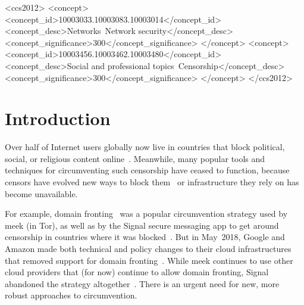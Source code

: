 \documentclass[sigconf]{acmart}
\begin{document}
\begin{CCSXML}
  <ccs2012>
  <concept>
  <concept_id>10003033.10003083.10003014</concept_id>
  <concept_desc>Networks~Network security</concept_desc>
  <concept_significance>300</concept_significance>
  </concept>
  <concept>
  <concept_id>10003456.10003462.10003480</concept_id>
  <concept_desc>Social and professional topics~Censorship</concept_desc>
  <concept_significance>300</concept_significance>
  </concept>
  </ccs2012>
\end{CCSXML}




\maketitle


\section{Introduction}

\FigHighLevel



Over half of Internet users globally
now live in countries that block political, social, or religious content
online~\cite{fotn2018}.
Meanwhile, many popular tools and techniques for circumventing such censorship
have ceased to function, because censors have evolved new ways to block them~\cite{ensafi-tor,great-cannon}
or infrastructure they rely on has become unavailable.



For example, domain fronting~\cite{meek} was a popular circumvention
strategy used by meek (in Tor), as well as by the Signal secure messaging app to
get around censorship in countries where it was
blocked~\cite{signal,signal-domain-fronting}.
But in May~2018, Google and Amazon made both technical and policy changes to
their cloud infrastructures that removed support for domain
fronting~\cite{aws-front}. While meek
continues to use other cloud providers that (for now) continue to allow domain
fronting, Signal abandoned the strategy altogether~\cite{signal-back-on-front}.
There is an urgent need for new, more robust approaches to circumvention.
\end{document}
